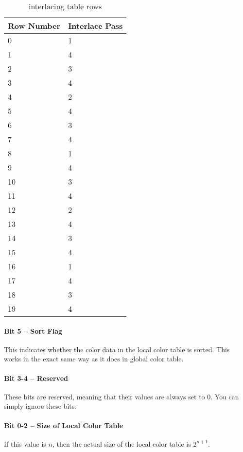 \begin{table}
  \centering
  \begin{tabular}{ll}
    \toprule
    Row Number & Interlace Pass \\
    \midrule
    0 & 1 \\
    1 & 4 \\
    2 & 3 \\
    3 & 4 \\
    4 & 2 \\
    5 & 4 \\
    6 & 3 \\
    7 & 4 \\
    8 & 1 \\
    9 & 4 \\
    10 & 3 \\
    11 & 4 \\
    12 & 2 \\
    13 & 4 \\
    14 & 3 \\
    15 & 4 \\
    16 & 1 \\
    17 & 4 \\
    18 & 3 \\
    19 & 4 \\
    \bottomrule
  \end{tabular}
  \caption{\gif interlacing table rows}
  \label{tab:gif-interlacing}
\end{table}

\paragraph{Bit 5 -- Sort Flag}

This indicates whether the color data in the local color table is
sorted. This works in the exact same way as it does in global color
table.

\paragraph{Bit 3-4 -- Reserved}

These bits are reserved, meaning that their values are always set to
$0$. You can simply ignore these bits.

\paragraph{Bit 0-2 -- Size of Local Color Table}

If this value is $n$, then the actual size of the local color table is
$2^{n + 1}$.

